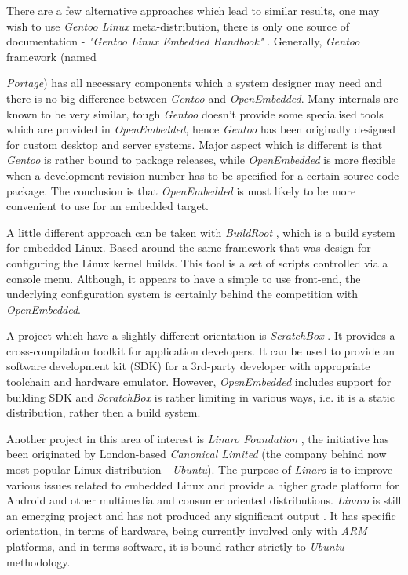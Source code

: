   There are a few alternative approaches which lead to similar results,
 one may wish to use \emph{Gentoo Linux} meta-distribution, there
 is only one source of documentation - \emph{"Gentoo Linux Embedded
 Handbook"} \cite{links:gentoo:embedded}. Generally, \emph{Gentoo}
 framework (named {\emph{Portage}) has all necessary components
 which a system designer may need and there is no big difference
 between \emph{Gentoo} and \emph{OpenEmbedded}. Many internals
 are known to be very similar, tough \emph{Gentoo} doesn't provide
 some specialised tools which are provided in \emph{OpenEmbedded},
 hence \emph{Gentoo} has been originally designed for custom
 desktop and server systems. Major aspect which is different is
 that \emph{Gentoo} is rather bound to package releases, while
 \emph{OpenEmbedded} is more flexible when a development revision
 number has to be specified for a certain source code package.
 The conclusion is that \emph{OpenEmbedded} is most likely to be
 more convenient to use for an embedded target.
 
  A little different approach can be taken with \emph{BuildRoot}
 \cite{links:buildroot:homepage}, which is a build system for
 embedded Linux. Based around the same framework that was design
 for configuring the Linux kernel builds. This tool is a set of
 scripts controlled via a console menu. Although, it appears to
 have a simple to use front-end, the underlying configuration
 system is certainly behind the competition with \emph{OpenEmbedded}.

  A project which have a slightly different orientation is
 \emph{ScratchBox} \cite{links:sbox:homepage}. It provides
 a cross-compilation toolkit for application developers.
 It can be used to provide an software development kit (SDK)
 for a 3rd-party developer with appropriate toolchain and
 hardware emulator. However, \emph{OpenEmbedded} includes
 support for building SDK and \emph{ScratchBox} is rather
 limiting in various ways, i.e. it is a static distribution,
 rather then a build system.
 
  Another project in this area of interest is \emph{Linaro Foundation}
 \cite{links:linaro:about}, the initiative has been originated by
 London-based \emph{Canonical Limited} (the company behind now most
 popular Linux distribution - \emph{Ubuntu}).
 The purpose of \emph{Linaro} is to improve various issues related to
 embedded Linux and provide a higher grade platform for Android and
 other multimedia and consumer oriented distributions. \emph{Linaro} is
 still an emerging project and has not produced any significant output
 \cite{links:linaro:homepage}. It has specific orientation, in terms of
 hardware, being currently involved only with \emph{ARM} platforms,
 and in terms software, it is bound rather strictly to \emph{Ubuntu}
 methodology.

}
